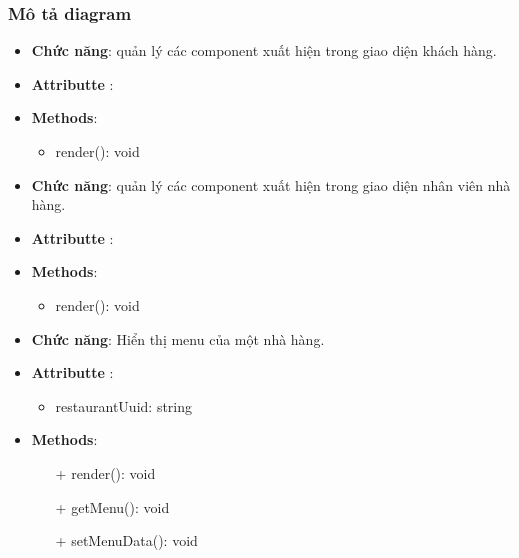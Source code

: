 \subsubsection{Mô tả diagram}
\begin{itemize}
    \item \textbf{Chức năng}: quản lý các component xuất hiện trong giao diện khách hàng.
    \item \textbf{Attributte} :
    \item \textbf{Methods}:
    \begin{itemize}
        \item render(): void
    \end{itemize}
\end{itemize}
\begin{itemize}
    \item \textbf{Chức năng}: quản lý các component xuất hiện trong giao diện nhân viên nhà hàng.
    \item \textbf{Attributte} :
    \item \textbf{Methods}:
    \begin{itemize}
        \item render(): void
    \end{itemize}
\end{itemize}
\begin{itemize}
    \item \textbf{Chức năng}: Hiển thị menu của một nhà hàng.
    \item \textbf{Attributte} :
    \begin{itemize}
        \item restaurantUuid: string
    \end{itemize}
    \item \textbf{Methods}:
    \begin{itemize}
        \item[+] render(): void
        \item[+] getMenu(): void
        \item[+] setMenuData(): void
    \end{itemize}
\end{itemize}
